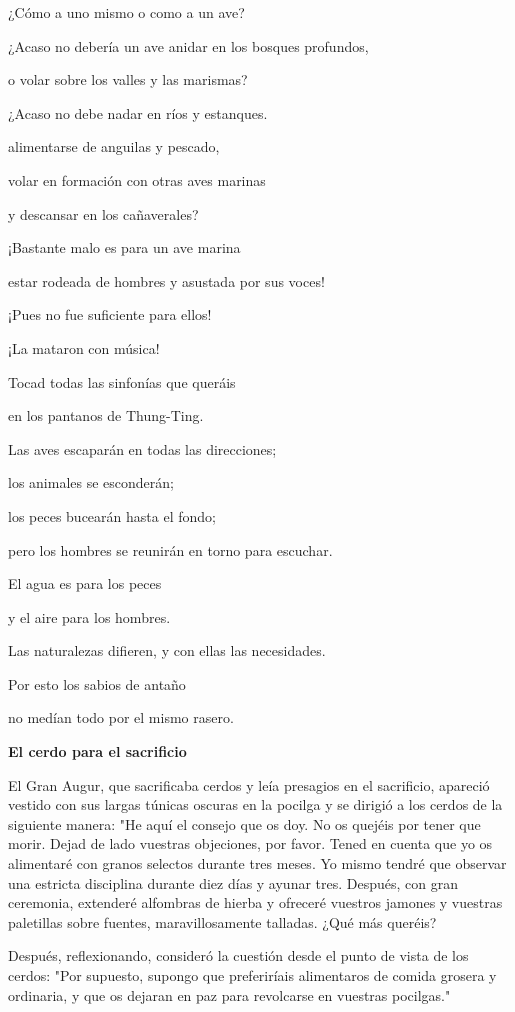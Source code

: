 ¿Cómo a uno mismo o como a un ave?

¿Acaso no debería un ave anidar en los bosques profundos,

o volar sobre los valles y las marismas?

¿Acaso no debe nadar en ríos y estanques.

alimentarse de anguilas y pescado,

volar en formación con otras aves marinas

y descansar en los cañaverales?

¡Bastante malo es para un ave marina

estar rodeada de hombres y asustada por sus voces!

¡Pues no fue suficiente para ellos!

¡La mataron con música!

Tocad todas las sinfonías que queráis

en los pantanos de Thung-Ting.

Las aves escaparán en todas las direcciones;

los animales se esconderán;

los peces bucearán hasta el fondo;

pero los hombres se reunirán en torno para escuchar.

El agua es para los peces

y el aire para los hombres.

Las naturalezas difieren, y con ellas las necesidades.

Por esto los sabios de antaño

no medían todo por el mismo rasero.

\textbf{{El cerdo para el sacrificio}}

El Gran Augur, que sacrificaba cerdos y leía presagios en el sacrificio,
apareció vestido con sus largas túnicas oscuras en la pocilga y se
dirigió a los cerdos de la siguiente manera: "He aquí el consejo que os
doy. No os quejéis por tener que morir. Dejad de lado vuestras
objeciones, por favor. Tened en cuenta que yo os alimentaré con granos
selectos durante tres meses. Yo mismo tendré que observar una estricta
disciplina durante diez días y ayunar tres. Después, con gran ceremonia,
extenderé alfombras de hierba y ofreceré vuestros jamones y vuestras
paletillas sobre fuentes, maravillosamente talladas. ¿Qué más queréis?

Después, reflexionando, consideró la cuestión desde el punto de vista de
los cerdos: "Por supuesto, supongo que preferiríais alimentaros de
comida grosera y ordinaria, y que os dejaran en paz para revolcarse en
vuestras pocilgas."

